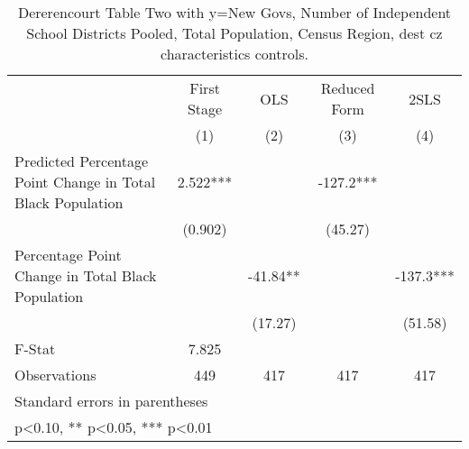 \begin{table}[htbp]\centering
\def\sym#1{\ifmmode^{#1}\else\(^{#1}\)\fi}
\caption{Dererencourt Table Two with y=New Govs, Number of Independent School Districts  Pooled, Total Population, Census Region, dest cz characteristics controls.}
\begin{tabular}{l*{4}{c}}
\toprule
                    & First Stage   &         OLS   &Reduced Form   &        2SLS   \\
                    &\multicolumn{1}{c}{(1)}   &\multicolumn{1}{c}{(2)}   &\multicolumn{1}{c}{(3)}   &\multicolumn{1}{c}{(4)}   \\
\midrule
Predicted Percentage Point Change in Total Black Population&       2.522***&               &      -127.2***&               \\
                    &     (0.902)   &               &     (45.27)   &               \\
\addlinespace
Percentage Point Change in Total Black Population&               &      -41.84** &               &      -137.3***\\
                    &               &     (17.27)   &               &     (51.58)   \\
\midrule
F-Stat              &       7.825   &               &               &               \\
Observations        &         449   &         417   &         417   &         417   \\
\bottomrule
\multicolumn{5}{l}{\footnotesize Standard errors in parentheses}\\
\multicolumn{5}{l}{\footnotesize * p<0.10, ** p<0.05, *** p<0.01}\\
\end{tabular}
\end{table}
